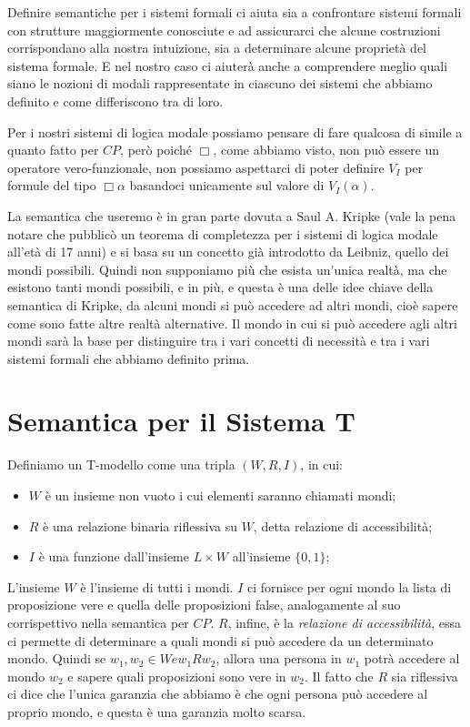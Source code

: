 \documentclass[a4paper, titlepage, 12pt]{report}
\begin{document}
Definire semantiche per i sistemi formali ci aiuta sia a confrontare sistemi formali
con strutture maggiormente conosciute e ad assicurarci
che alcune costruzioni corrispondano alla nostra intuizione,
sia a determinare alcune proprietà del sistema formale. E nel nostro caso ci aiuterà anche
a comprendere meglio quali siano le nozioni di modali rappresentate in ciascuno dei sistemi
che abbiamo definito e come differiscono tra di loro.

Per i nostri sistemi di logica modale possiamo pensare di fare qualcosa di simile
a quanto fatto per $CP$, però poiché $\Box$, come abbiamo visto, non può essere
un operatore vero-funzionale, non possiamo aspettarci di poter definire $V_I$ per formule
del tipo $\Box \alpha$ basandoci unicamente sul valore di $V_I(\alpha)$.

La semantica che useremo è in gran parte dovuta a Saul A. Kripke (vale la pena notare
che pubblicò un teorema di completezza per i sistemi di logica modale all'età di 17 anni)
e si basa su un concetto già introdotto da Leibniz, quello dei mondi possibili.
Quindi non supponiamo più che esista un'unica realtà, ma che esistono tanti mondi possibili,
e in più, e questa è una delle idee chiave della semantica di Kripke, da alcuni mondi
si può accedere ad altri mondi, cioè sapere come sono fatte altre realtà alternative.
Il mondo in cui si può accedere agli altri mondi sarà la base per distinguire
tra i vari concetti di necessità e tra i vari sistemi formali che abbiamo definito prima.

\section{Semantica per il Sistema T}
Definiamo un T-modello come una tripla $(W, R, I)$, in cui:
\begin{itemize}
\item $W$ è un insieme non vuoto i cui elementi saranno chiamati mondi;
\item $R$ è una relazione binaria riflessiva su $W$, detta relazione di accessibilità;
\item $I$ è una funzione dall'insieme $L \times W$ all'insieme $\{0, 1\}$;
\end{itemize}

L'insieme $W$ è l'insieme di tutti i mondi.
$I$ ci fornisce per ogni mondo la lista di proposizione vere
e quella delle proposizioni false, analogamente al suo corrispettivo nella semantica per $CP$.
$R$, infine, è la \textit{relazione di accessibilità},
essa ci permette di determinare a quali mondi si può accedere da un determinato mondo.
Quindi se $w_1, w_2 \in W e w_1 R w_2$, allora una persona in $w_1$ potrà accedere
al mondo $w_2$ e sapere quali proposizioni sono vere in $w_2$.
Il fatto che $R$ sia riflessiva ci dice che l'unica garanzia che abbiamo
è che ogni persona può accedere al proprio mondo, e questa è una garanzia molto scarsa.
\end{document}
